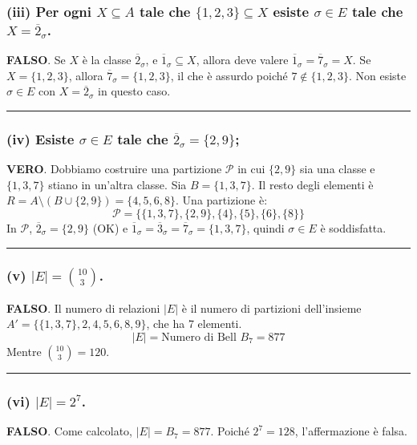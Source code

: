 \subsubsection*{(iii) Per ogni $X \subseteq A$ tale che $\{1, 2, 3\} \subseteq X$ esiste $\sigma \in E$ tale che $X = \overline{2}_{\sigma}$.}
\textbf{FALSO}.
Se $X$ è la classe $\overline{2}_{\sigma}$, e $\overline{1}_{\sigma} \subseteq X$, allora deve valere $\overline{1}_{\sigma} = \overline{7}_{\sigma} = X$.
Se $X = \{1, 2, 3\}$, allora $\overline{7}_{\sigma} = \{1, 2, 3\}$, il che è assurdo poiché $7 \notin \{1, 2, 3\}$. Non esiste $\sigma \in E$ con $X = \overline{2}_{\sigma}$ in questo caso.

\vspace{0.3cm}
\hrule
\vspace{0.3cm}

\subsubsection*{(iv) Esiste $\sigma \in E$ tale che $\overline{2}_{\sigma} = \{2, 9\}$;}
\textbf{VERO}.
Dobbiamo costruire una partizione $\mathcal{P}$ in cui $\{2, 9\}$ sia una classe e $\{1, 3, 7\}$ stiano in un'altra classe.
Sia $B = \{1, 3, 7\}$. Il resto degli elementi è $R = A \setminus (B \cup \{2, 9\}) = \{4, 5, 6, 8\}$.
Una partizione è:
$$ \mathcal{P} = \{\{1, 3, 7\}, \{2, 9\}, \{4\}, \{5\}, \{6\}, \{8\}\} $$
In $\mathcal{P}$, $\overline{2}_{\sigma} = \{2, 9\}$ (OK) e $\overline{1}_{\sigma} = \overline{3}_{\sigma} = \overline{7}_{\sigma} = \{1, 3, 7\}$, quindi $\sigma \in E$ è soddisfatta.

\vspace{0.3cm}
\hrule
\vspace{0.3cm}

\subsubsection*{(v) $|E| = \binom{10}{3}$.}
\textbf{FALSO}.
Il numero di relazioni $|E|$ è il numero di partizioni dell'insieme $A' = \{\{1, 3, 7\}, 2, 4, 5, 6, 8, 9\}$, che ha 7 elementi.
$$ |E| = \text{Numero di Bell } B_7 = 877 $$
Mentre $\binom{10}{3} = 120$.

\vspace{0.3cm}
\hrule
\vspace{0.3cm}

\subsubsection*{(vi) $|E| = 2^7$.}
\textbf{FALSO}.
Come calcolato, $|E| = B_7 = 877$. Poiché $2^7 = 128$, l'affermazione è falsa.

